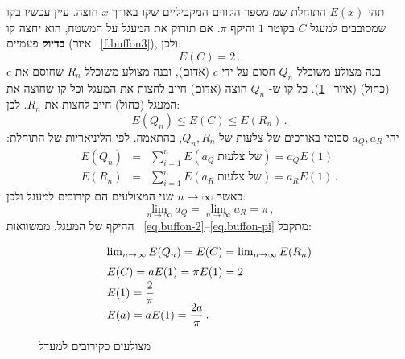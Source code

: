 תהי 
$E(x)$
התוחלת שמ מספר הקווים המקביליים שקו באורך
$x$
חוצה. עיין עכשיו בקו שמסובבים למעגל
$C$
\textbf{בקוטר}
$1$
והיקף
$\pi$.
אם תזרוק את המעגל על המשטח, הוא יחצה קו 
\textbf{בדיוק}
פעמיים (איור%
~\ref{f.buffon3}),
ולכן:
\begin{equation}\label{eq.buffon-2}
E(C)=2\,.
\end{equation}
בנה מצולע משוכלל
$Q_n$
חסום על ידי 
$c$
(אדום), ובנה מצולע משוכלל 
$R_n$
שחוסם את
$c$
(כחול) (איור%
~\ref{f.buffon4}). 
כל קו ש-%
$Q_n$
חוצה (אדום) חייב לחצות את המעגל וכל קו שחוצה את המעגל (כחול) חייב לחצות את 
$R_n$.
לכן:
\begin{equation}\label{eq.buffon3}
E(Q_n)\leq E(C)\leq E(R_n)\,.
\end{equation}
יהי 
$a_Q, a_R$
סכומי באורכים של צלעות של
$Q_n,R_n$,
בהתאמה. לפי הליניאריות של התוחלת:
{
\addtolength{\arraycolsep}{-3pt}
\begin{eqnarray}\label{eq.buffon1a}
E(Q_n)&=&\sum_{i=1}^n E(a_Q\;\textrm{של צלעות})=a_QE(1)\\
\label{eq.buffon1b}E(R_n)&=&\sum_{i=1}^n E(a_R\;\textrm{של צלעות})=a_RE(1)\,. 
\end{eqnarray}
}
כאשר 
$n\rightarrow\infty$
שני המצולעים הם קירובים למעגל ולכן:
\begin{equation}\label{eq.buffon-pi}
\lim_{n\rightarrow\infty}a_Q = \lim_{n\rightarrow\infty} a_R=\pi\,,
\end{equation}
ההיקף של המעגל. ממשוואות%
~\ref{eq.buffon-2}--\ref{eq.buffon-pi}
מתקבל:
\[
\renewcommand*{\arraystretch}{1.5}
\begin{array}{l}
\lim_{n\rightarrow\infty}E(Q_n)=E(C) =\lim_{n\rightarrow\infty}E(R_n)\\
E(C)=aE(1) =\pi E(1) = 2\\
E(1)=\disfrac{2}{\pi}\\
E(a)=aE(1)=\disfrac{2a}{\pi}\,.
\end{array}
\]
\begin{figure}[bt]
\begin{center}
\end{center}
\caption{מצולעים כקירובים למעדל}\label{f.buffon4}
\end{figure}

